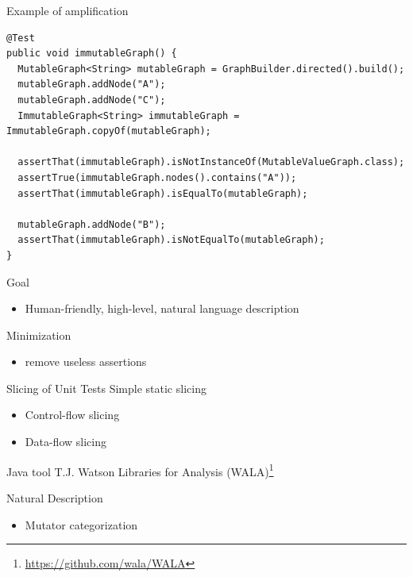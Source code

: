 \documentclass[aspectratio=169]{beamer}
\begin{document}
\begin{frame}[fragile]{Example of amplification}
  \begin{verbatim}
@Test
public void immutableGraph() {
  MutableGraph<String> mutableGraph = GraphBuilder.directed().build();
  mutableGraph.addNode("A");
  mutableGraph.addNode("C");
  ImmutableGraph<String> immutableGraph = ImmutableGraph.copyOf(mutableGraph);

  assertThat(immutableGraph).isNotInstanceOf(MutableValueGraph.class);
  assertTrue(immutableGraph.nodes().contains("A"));
  assertThat(immutableGraph).isEqualTo(mutableGraph);

  mutableGraph.addNode("B");
  assertThat(immutableGraph).isNotEqualTo(mutableGraph);
}
  \end{verbatim}
\end{frame}

\begin{frame}{Goal}
  \begin{itemize}
    \item Human-friendly, high-level, natural language description
  \end{itemize}
\end{frame}

\begin{frame}{Minimization}
  \begin{itemize}
    \item remove useless assertions
  \end{itemize}
\end{frame}

\begin{frame}{Slicing of Unit Tests}
  Simple static slicing
  \begin{itemize}
    \item Control-flow slicing
    \item Data-flow slicing
  \end{itemize}

  \begin{block}{Java tool}
    T.J. Watson Libraries for Analysis (WALA)\footnote{\url{https://github.com/wala/WALA}}
  \end{block}
\end{frame}

\begin{frame}{Natural Description}
  \begin{itemize}
    \item Mutator categorization
  \end{itemize}
\end{frame}
\end{document}
